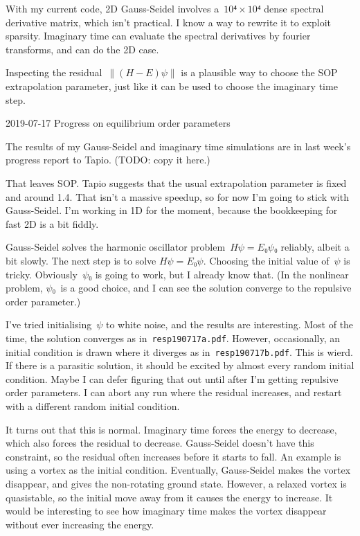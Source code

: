 With my current code, 2D Gauss-Seidel involves a~$10⁴×10⁴$ dense spectral derivative matrix, which isn't practical.  I know a way to rewrite it to exploit sparsity.  Imaginary time can evaluate the spectral derivatives by fourier transforms, and can do the 2D case.

Inspecting the residual~$∥(H-E)ψ∥$ is a plausible way to choose the SOP extrapolation parameter, just like it can be used to choose the imaginary time step.

2019-07-17 Progress on equilibrium order parameters

The results of my Gauss-Seidel and imaginary time simulations are in last week's progress report to Tapio.  (TODO: copy it here.)  

That leaves SOP.  Tapio suggests that the usual extrapolation parameter is fixed and around 1.4.  That isn't a massive speedup, so for now I'm going to stick with Gauss-Seidel.  I'm working in 1D for the moment, because the bookkeeping for fast 2D is a bit fiddly.

Gauss-Seidel solves the harmonic oscillator problem~$Hψ=E₀ψ₀$ reliably, albeit a bit slowly.  The next step is to solve $Hψ=E₀ψ$.  Choosing the initial value of~$ψ$ is tricky.  Obviously~$ψ₀$ is going to work, but I already know that.  (In the nonlinear problem, $ψ₀$~is a good choice, and I can see the solution converge to the repulsive order parameter.)

I've tried initialising~$ψ$ to white noise, and the results are interesting.  Most of the time, the solution converges as in~{\tt resp190717a.pdf}.  However, occasionally, an initial condition is drawn where it diverges as in~{\tt resp190717b.pdf}.  This is wierd.  If there is a parasitic solution, it should be excited by almost every random initial condition.  Maybe I can defer figuring that out until after I'm getting repulsive order parameters.  I can abort any run where the residual increases, and restart with a different random initial condition.

It turns out that this is normal.  Imaginary time forces the energy to decrease, which also forces the residual to decrease.  Gauss-Seidel doesn't have this constraint, so the residual often increases before it starts to fall.  An example is using a vortex as the initial condition.  Eventually, Gauss-Seidel makes the vortex disappear, and gives the non-rotating ground state.  However, a relaxed vortex is quasistable, so the initial move away from it causes the energy to increase.  It would be interesting to see how imaginary time makes the vortex disappear without ever increasing the energy.

